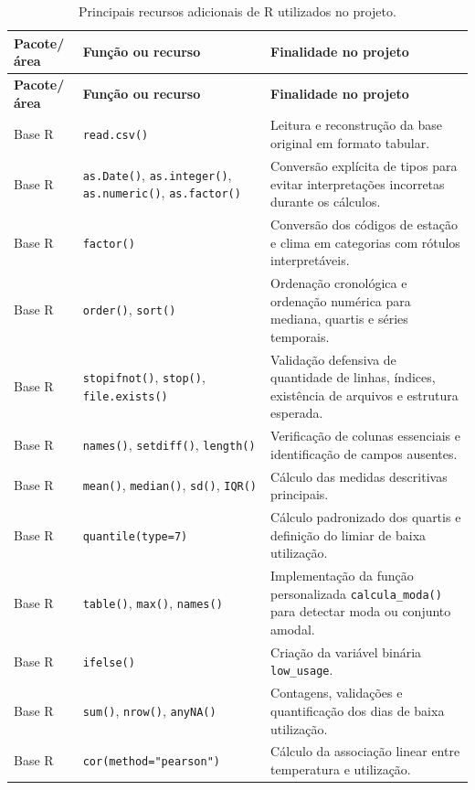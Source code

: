\documentclass[12pt,oneside,a4paper,english,brazil]{abntex2}
\begin{document}
\small
\begin{longtable}{p{3.2cm}p{4.2cm}p{7.1cm}}
\caption{Principais recursos adicionais de R utilizados no projeto.}\label{tab:funcoesR}\\
\toprule
\rowcolor{lilasclaro}
\textbf{Pacote/área} & \textbf{Função ou recurso} & \textbf{Finalidade no projeto} \\
\midrule
\endfirsthead
\toprule
\rowcolor{lilasclaro}
\textbf{Pacote/área} & \textbf{Função ou recurso} & \textbf{Finalidade no projeto} \\
\midrule
\endhead
Base R & \texttt{read.csv()} & Leitura e reconstrução da base original em formato tabular. \\
Base R & \texttt{as.Date()}, \texttt{as.integer()}, \texttt{as.numeric()}, \texttt{as.factor()} & Conversão explícita de tipos para evitar interpretações incorretas durante os cálculos. \\
Base R & \texttt{factor()} & Conversão dos códigos de estação e clima em categorias com rótulos interpretáveis. \\
Base R & \texttt{order()}, \texttt{sort()} & Ordenação cronológica e ordenação numérica para mediana, quartis e séries temporais. \\
Base R & \texttt{stopifnot()}, \texttt{stop()}, \texttt{file.exists()} & Validação defensiva de quantidade de linhas, índices, existência de arquivos e estrutura esperada. \\
Base R & \texttt{names()}, \texttt{setdiff()}, \texttt{length()} & Verificação de colunas essenciais e identificação de campos ausentes. \\
Base R & \texttt{mean()}, \texttt{median()}, \texttt{sd()}, \texttt{IQR()} & Cálculo das medidas descritivas principais. \\
Base R & \texttt{quantile(type=7)} & Cálculo padronizado dos quartis e definição do limiar de baixa utilização. \\
Base R & \texttt{table()}, \texttt{max()}, \texttt{names()} & Implementação da função personalizada \texttt{calcula\_moda()} para detectar moda ou conjunto amodal. \\
Base R & \texttt{ifelse()} & Criação da variável binária \texttt{low\_usage}. \\
Base R & \texttt{sum()}, \texttt{nrow()}, \texttt{anyNA()} & Contagens, validações e quantificação dos dias de baixa utilização. \\
Base R & \texttt{cor(method="pearson")} & Cálculo da associação linear entre temperatura e utilização. \\

\end{longtable}
\end{document}
